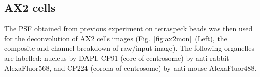 \subsection{AX2 cells}

The PSF obtained from previous experiment on tetraspeck beads was then used for the deconvolution of AX2 cells images (Fig.~\ref{fig:ax2mon}~(Left), the composite and channel breakdown of raw/input image). 
The following organelles are labelled: nucleus by DAPI, CP91 (core of centrosome) by anti-rabbit-AlexaFluor568, and CP224 (corona of centrosome) by anti-mouse-AlexaFluor488.



